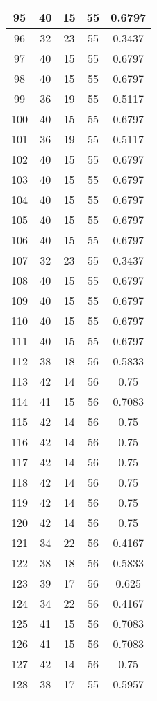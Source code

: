 \documentclass[letterpaper, 12pt]{article}
\begin{document}
\begin{longtable}{|c|c|c|c|c|}
\hline
95 & 40 & 15 & 55 & 0.6797 \\
\hline
96 & 32 & 23 & 55 & 0.3437 \\
\hline
97 & 40 & 15 & 55 & 0.6797 \\
\hline
98 & 40 & 15 & 55 & 0.6797 \\
\hline
99 & 36 & 19 & 55 & 0.5117 \\
\hline
100 & 40 & 15 & 55 & 0.6797 \\
\hline
101 & 36 & 19 & 55 & 0.5117 \\
\hline
102 & 40 & 15 & 55 & 0.6797 \\
\hline
103 & 40 & 15 & 55 & 0.6797 \\
\hline
104 & 40 & 15 & 55 & 0.6797 \\
\hline
105 & 40 & 15 & 55 & 0.6797 \\
\hline
106 & 40 & 15 & 55 & 0.6797 \\
\hline
107 & 32 & 23 & 55 & 0.3437 \\
\hline
108 & 40 & 15 & 55 & 0.6797 \\
\hline
109 & 40 & 15 & 55 & 0.6797 \\
\hline
110 & 40 & 15 & 55 & 0.6797 \\
\hline
111 & 40 & 15 & 55 & 0.6797 \\
\hline
112 & 38 & 18 & 56 & 0.5833 \\
\hline
113 & 42 & 14 & 56 & 0.75 \\
\hline
114 & 41 & 15 & 56 & 0.7083 \\
\hline
115 & 42 & 14 & 56 & 0.75 \\
\hline
116 & 42 & 14 & 56 & 0.75 \\
\hline
117 & 42 & 14 & 56 & 0.75 \\
\hline
118 & 42 & 14 & 56 & 0.75 \\
\hline
119 & 42 & 14 & 56 & 0.75 \\
\hline
120 & 42 & 14 & 56 & 0.75 \\
\hline
121 & 34 & 22 & 56 & 0.4167 \\
\hline
122 & 38 & 18 & 56 & 0.5833 \\
\hline
123 & 39 & 17 & 56 & 0.625 \\
\hline
124 & 34 & 22 & 56 & 0.4167 \\
\hline
125 & 41 & 15 & 56 & 0.7083 \\
\hline
126 & 41 & 15 & 56 & 0.7083 \\
\hline
127 & 42 & 14 & 56 & 0.75 \\
\hline
128 & 38 & 17 & 55 & 0.5957 \\

\end{longtable}
\end{document}
